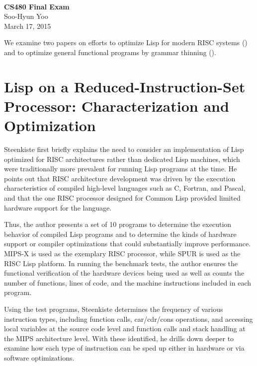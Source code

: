 \documentclass[12pt,letterpaper]{article}
\begin{document}
\fancyfoot{}
\begin{center}
    \hfill \\
    \vspace{4in}
    {\bf\Huge CS480 Final Exam \\}
    \vspace{2in}
    {\Large Soo-Hyun Yoo \\ March 17, 2015}
\end{center}

\newpage
{}

We examine two papers on efforts to optimize Lisp for modern RISC systems
(\cite{steenkiste1987}) and to optimize general functional programs by grammar
thinning (\cite{webber1995}).

\section*{Lisp on a Reduced-Instruction-Set Processor: Characterization and Optimization}

Steenkiste first briefly explains the need to consider an implementation of
Lisp optimized for RISC architectures rather than dedicated Lisp machines,
which were traditionally more prevalent for running Lisp programs at the time.
He points out that RISC architecture development was driven by the execution
characteristics of compiled high-level languages such as C, Fortran, and
Pascal, and that the one RISC processor designed for Common Lisp provided
limited hardware support for the language.

Thus, the author presents a set of 10 programs to determine the execution
behavior of compiled Lisp programs and to determine the kinds of hardware
support or compiler optimizations that could substantially improve performance.
MIPS-X is used as the exemplary RISC processor, while SPUR is used as the RISC
Lisp platform. In running the benchmark tests, the author ensures the
functional verification of the hardware devices being used as well as counts
the number of functions, lines of code, and the machine instructions included
in each program.

Using the test programs, Steenkiste determines the frequency of various
instruction types, including function calls, car/cdr/cons operations, and
accessing local variables at the source code level and function calls and stack
handling at the MIPS architecture level. With these identified, he drills down
deeper to examine how each type of instruction can be sped up either in
hardware or via software optimizations.
\end{document}
